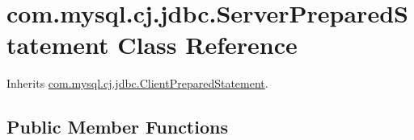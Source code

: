 \hypertarget{classcom_1_1mysql_1_1cj_1_1jdbc_1_1_server_prepared_statement}{}\section{com.\+mysql.\+cj.\+jdbc.\+Server\+Prepared\+Statement Class Reference}
\label{classcom_1_1mysql_1_1cj_1_1jdbc_1_1_server_prepared_statement}


Inherits \mbox{\hyperlink{classcom_1_1mysql_1_1cj_1_1jdbc_1_1_client_prepared_statement}{com.\+mysql.\+cj.\+jdbc.\+Client\+Prepared\+Statement}}.

\subsection*{Public Member Functions}
